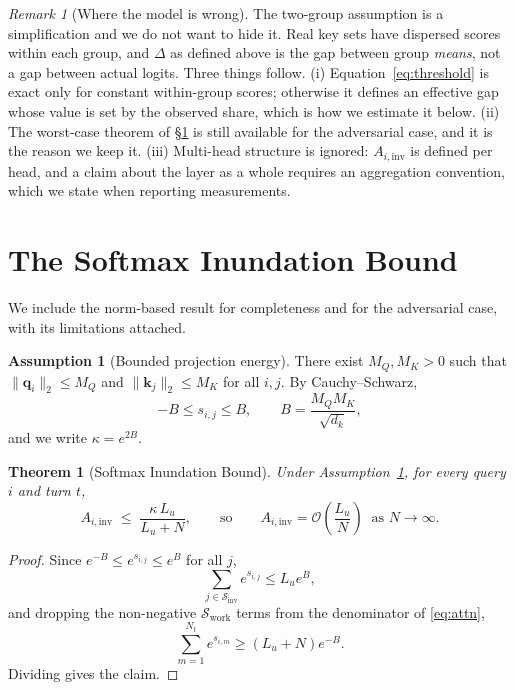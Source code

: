 \documentclass[11pt,a4paper]{article}
\theoremstyle{plain}
\newtheorem{theorem}{Theorem}
\theoremstyle{definition}
\newtheorem{assumption}{Assumption}
\theoremstyle{remark}
\newtheorem{remark}{Remark}
\newcommand{\Sinv}{\mathcal{S}_{\mathrm{inv}}}
\newcommand{\Swork}{\mathcal{S}_{\mathrm{work}}}
\newcommand{\Ainv}{A_{i,\mathrm{inv}}}
\begin{document}
\begin{remark}[Where the model is wrong]
\label{rem:limits}
The two-group assumption is a simplification and we do not want to hide it.
Real key sets have dispersed scores within each group, and $\Delta$ as defined
above is the gap between group \emph{means}, not a gap between actual logits.
Three things follow. (i) Equation~\eqref{eq:threshold} is exact only for
constant within-group scores; otherwise it defines an effective gap whose value
is set by the observed share, which is how we estimate it below. (ii) The
worst-case theorem of \S\ref{sec:bound} is still available for the adversarial
case, and it is the reason we keep it. (iii) Multi-head structure is ignored:
$\Ainv$ is defined per head, and a claim about the layer as a whole requires an
aggregation convention, which we state when reporting measurements.
\end{remark}

\section{The Softmax Inundation Bound}
\label{sec:bound}

We include the norm-based result for completeness and for the adversarial case,
with its limitations attached.

\begin{assumption}[Bounded projection energy]
\label{assump:bounded}
There exist $M_Q, M_K > 0$ such that $\|\mathbf{q}_i\|_2 \le M_Q$ and
$\|\mathbf{k}_j\|_2 \le M_K$ for all $i,j$. By Cauchy--Schwarz,
\begin{equation}
  -B \le s_{i,j} \le B, \qquad B = \frac{M_Q M_K}{\sqrt{d_k}},
\end{equation}
and we write $\kappa = e^{2B}$.
\end{assumption}

\begin{theorem}[Softmax Inundation Bound]
\label{thm:inundation}
Under Assumption~\ref{assump:bounded}, for every query $i$ and turn $t$,
\begin{equation}
  \Ainv \;\le\; \frac{\kappa\, L_u}{L_u + N},
  \qquad\text{so}\qquad
  \Ainv = \mathcal{O}\!\left(\frac{L_u}{N}\right)
  \ \text{ as } N \to \infty .
  \label{eq:inundation}
\end{equation}
\end{theorem}

\begin{proof}
Since $e^{-B} \le e^{s_{i,j}} \le e^{B}$ for all $j$,
\begin{equation}
  \sum_{j\in\Sinv} e^{s_{i,j}} \le L_u e^{B},
\end{equation}
and dropping the non-negative $\Swork$ terms from the denominator of
\eqref{eq:attn},
\begin{equation}
  \sum_{m=1}^{N_t} e^{s_{i,m}} \ge (L_u + N)e^{-B}.
\end{equation}
Dividing gives the claim.
\end{proof}
\end{document}
